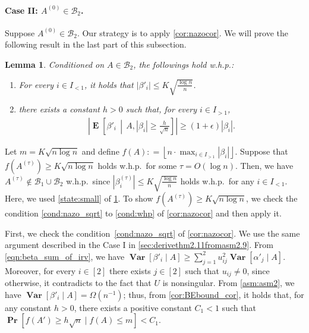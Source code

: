 \documentclass[letterpaper,11pt]{article}
\newtheorem{lemma}[theorem]{Lemma}
\renewcommand\Pr{\mathop{\mathbf{Pr}}}
\DeclareMathOperator{\E}{\mathbf{E}}
\newcommand{\Var}{\mathop{\mathbf{Var}}}%
\def\defeq{\mathrel{\mathop:}=}%
\begin{document}
\paragraph*{Case I\hspace{-.1em}I: $A^{(0)}\in\mathcal{B}_2$.}
Suppose $A^{(0)}\in \mathcal{B}_2$.
Our strategy is to apply \cref{cor:nazocor}.
We will prove the following result in the last part of this subsection.
\begin{lemma} \label{lem:beta'bounds}
Conditioned on $A\in \mathcal{B}_2$, the followings hold w.h.p.:

\begin{enumerate}[label=(\roman*)]

\item\label{state:small} For every $i\in I_{<1}$, it holds that $|\beta'_i|\leq K\sqrt{\frac{\log n}{n}}$.

\item\label{state:large} there exists a constant $h>0$ such that, for every $i\in I_{>1}$, 
\begin{align*}
\left|\E\left[\beta'_i\,\middle|\,A,|\beta_i|\geq \frac{h}{\sqrt{n}}\right]\right| \geq (1+\epsilon) |\beta_i|.
\end{align*}
\end{enumerate}
\end{lemma}
Let $m=K\sqrt{n\log n}$ and define $f(A)\defeq\left\lfloor n\cdot \max_{i\in I_{>1}}|\beta_i| \right\rfloor$.
Suppose that $f(A^{(\tau)}) \geq K\sqrt{n\log n} $ holds w.h.p.~for some $\tau=O(\log n)$.
Then, we have $A^{(\tau)}\not\in\mathcal{B}_1\cup\mathcal{B}_2$ w.h.p.~since $|\beta_i^{(\tau)}|\leq K\sqrt{\frac{\log n}{n}}$ holds w.h.p.~for any $i\in I_{< 1}$.
Here, we used \ref{state:small} of \cref{lem:beta'bounds}.
To show $f(A^{(\tau)}) \geq K\sqrt{n\log n}$, we check the condition \ref{cond:nazo_sqrt} to \ref{cond:whp} of \cref{cor:nazocor} and then apply it.

First, we check the condition~\ref{cond:nazo_sqrt} of \cref{cor:nazocor}.
We use the same argument described in the Case I in \cref{sec:derivethm2.11fromasm2.9}.
From \cref{eqn:beta_sum_of_irv}, we have $\Var[\beta'_i \mid A]\geq \sum_{j=1}^2 u_{ij}^2 \Var[\alpha'_j \mid A]$.
Moreover, for every $i\in[2]$ there exists $j\in[2]$ such that $u_{ij}\neq 0$, since otherwise, it contradicts to the fact that $U$ is nonsingular.
From \ref{asm:asm2}, we have $\Var[\beta'_i \mid A]=\Omega(n^{-1})$; thus, from \cref{cor:BEbound_cor}, it holds that, for any constant $h>0$, there exists a positive constant $C_1<1$ such that $\Pr[f(A')\geq h\sqrt{n} \mid f(A)\leq m] < C_1$.
\end{document}
